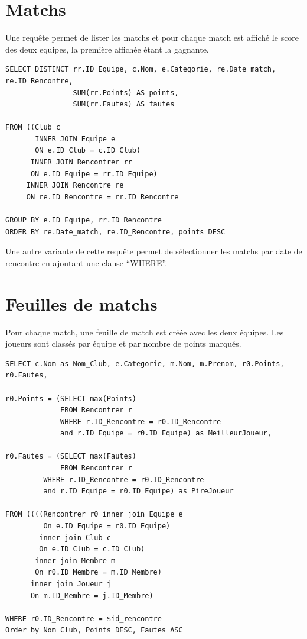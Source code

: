 \documentclass[a4paper,8pt,french,fleqn]{report}
\begin{document}
\section{Matchs}
Une requête permet de lister les matchs et pour chaque match est affiché le score des deux equipes, la première affichée étant la gagnante.

\begin{lstlisting}
SELECT DISTINCT rr.ID_Equipe, c.Nom, e.Categorie, re.Date_match, re.ID_Rencontre,
                SUM(rr.Points) AS points, 
                SUM(rr.Fautes) AS fautes 
		                      
FROM ((Club c
       INNER JOIN Equipe e
       ON e.ID_Club = c.ID_Club) 
      INNER JOIN Rencontrer rr
      ON e.ID_Equipe = rr.ID_Equipe)
     INNER JOIN Rencontre re
     ON re.ID_Rencontre = rr.ID_Rencontre

GROUP BY e.ID_Equipe, rr.ID_Rencontre
ORDER BY re.Date_match, re.ID_Rencontre, points DESC
\end{lstlisting}

Une autre variante de cette requête permet de sélectionner les matchs par date de rencontre en ajoutant une clause ``WHERE''.


\section{Feuilles de matchs}

Pour chaque match, une feuille de match est créée avec les deux équipes. Les joueurs sont classés par équipe et par nombre de points marqués.

\begin{lstlisting}
SELECT c.Nom as Nom_Club, e.Categorie, m.Nom, m.Prenom, r0.Points, r0.Fautes, 

r0.Points = (SELECT max(Points) 
             FROM Rencontrer r
             WHERE r.ID_Rencontre = r0.ID_Rencontre
             and r.ID_Equipe = r0.ID_Equipe) as MeilleurJoueur,

r0.Fautes = (SELECT max(Fautes) 
             FROM Rencontrer r
	     WHERE r.ID_Rencontre = r0.ID_Rencontre
	     and r.ID_Equipe = r0.ID_Equipe) as PireJoueur 
								
FROM ((((Rencontrer r0 inner join Equipe e
         On e.ID_Equipe = r0.ID_Equipe) 
        inner join Club c            
        On e.ID_Club = c.ID_Club) 
       inner join Membre m
       On r0.ID_Membre = m.ID_Membre) 
      inner join Joueur j
      On m.ID_Membre = j.ID_Membre)

WHERE r0.ID_Rencontre = $id_rencontre
Order by Nom_Club, Points DESC, Fautes ASC
\end{lstlisting}
\end{document}
